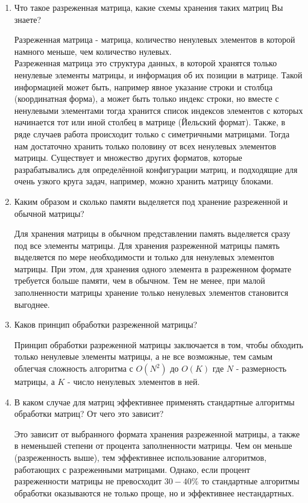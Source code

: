 \begin{enumerate}
	\item Что такое разреженная матрица, какие схемы хранения таких матриц Вы знаете?
	
	Разреженная матрица - матрица, количество ненулевых элементов в которой намного меньше, чем количество нулевых. \\
	Разреженная матрица это структура данных, в которой хранятся только ненулевые элементы матрицы, и информация об их позиции в матрице. Такой информацией может быть, например явное указание строки и столбца (координатная форма), а может быть только индекс строки, но вместе с ненулевыми  элементами  тогда  хранится  список  индексов  элементов  с которых начинается тот или иной столбец в матрице (Йельский формат). Также,  в  ряде  случаев  работа  происходит  только  с  симетричными матрицами.  Тогда  нам  достаточно  хранить  только  половину  от  всех ненулевых элементов матрицы. Существует и множество других форматов, которые разрабатывались для определённой конфигурации матриц, и подходящие для очень узкого круга задач, например, можно хранить матрицу блоками.
	
	\item Каким  образом  и  сколько  памяти  выделяется  под  хранение разреженной и обычной матрицы? 
	
	Для хранения матрицы в обычном представлении память выделяется сразу под все элементы матрицы. Для  хранения  разреженной  матрицы  память  выделяется  по  мере необходимости и только для ненулевых элементов матрицы. При  этом,  для  хранения одного  элемента  в  разреженном  формате требуется  больше  памяти,  чем  в  обычном.  Тем  не  менее,  при  малой заполненности матрицы хранение только ненулевых элементов становится выгоднее.
	
	\item Каков принцип обработки разреженной матрицы?
	
	Принцип обработки разреженной матрицы заключается в том, чтобы обходить только ненулевые элементы матрицы, а не все возможные, тем самым облегчая сложность алгоритма с $O(N^2)$  до $O(K)$  где $N$  -  размерность матрицы, а $K$ - число ненулевых элементов в ней.
	
	\item В  каком  случае  для  матриц  эффективнее  применять стандартные алгоритмы обработки матриц? От чего это зависит? 
	
	Это зависит от выбранного формата хранения разреженной матрицы, а также в неменьшей степени от процента заполненности матрицы. Чем он меньше (разреженность выше), тем эффективнее использование алгоритмов, работающих с разреженными матрицами. Однако, если процент разреженности матрицы не превосходит $30-40\%$ то стандартные  алгоритмы  обработки  оказываются  не  только  проще,  но  и эффективнее нестандартных. 
\end{enumerate}



















